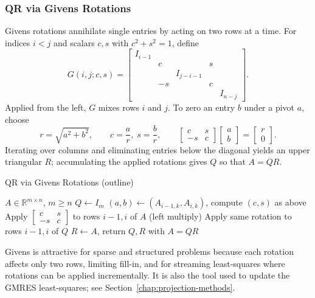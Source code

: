 \documentclass[../../main.tex]{subfiles}
\begin{document}
\subsubsection{QR via Givens Rotations}
\label{subsec:givens-qr}
Givens rotations annihilate single entries by acting on two rows at a time. For indices $i<j$ and scalars $c,s$ with $c^2+s^2=1$, define
\[
    G(i,j;c,s)=\begin{bmatrix}
        I_{i-1}                         \\
         & c  &           & s           \\
         &    & I_{j-i-1} &             \\
         & -s &           & c           \\
         &    &           &   & I_{n-j}
    \end{bmatrix}.
\]
Applied from the left, $G$ mixes rows $i$ and $j$. To zero an entry $b$ under a pivot $a$, choose
\[
    r=\sqrt{a^2+b^2},\qquad c=\frac{a}{r},\; s=\frac{b}{r},\qquad \begin{bmatrix}c&s\\-s&c\end{bmatrix}\begin{bmatrix}a\\ b\end{bmatrix}=\begin{bmatrix}r\\ 0\end{bmatrix}.
\]
Iterating over columns and eliminating entries below the diagonal yields an upper triangular $R$; accumulating the applied rotations gives $Q$ so that $A=QR$.
\begin{algorithm}[H]
    \caption{QR via Givens Rotations (outline)}
    \begin{algorithmic}[0]
        \Require $A\in\mathbb{R}^{m\times n}$, $m\ge n$
        \State $Q\gets I_m$
        \State $(a,b)\gets (A_{i-1,k},A_{i,k})$, compute $(c,s)$ as above
        \State Apply $\begin{bmatrix}c&s\\-s&c\end{bmatrix}$ to rows $i-1,i$ of $A$ (left multiply)
        \State Apply same rotation to rows $i-1,i$ of $Q$
        \EndFor
        \EndFor
        \State $R\gets A$, return $Q,R$ with $A=QR$
    \end{algorithmic}
\end{algorithm}
Givens is attractive for sparse and structured problems because each rotation affects only two rows, limiting fill-in, and for streaming least-squares where rotations can be applied incrementally. It is also the tool used to update the GMRES least-squares; see Section~\ref{chap:projection-methods}.
\end{document}
